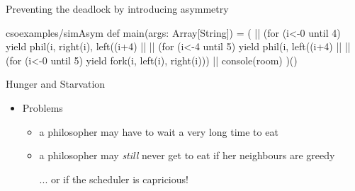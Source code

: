 \documentclass{concdistfoils}
\def\heading#1{\begin{cframed}[8.8in]{#1}\end{cframed}}
\begin{document}
\begin{slide}
\begin{exercises}
\begin{ex**}{Preventing the deadlock by introducing asymmetry}
\begin{ans}
\begin{obj}{csoexamples/simAsym}
{  def main(args: Array[String]) =
  { (  || (for (i<-0 until 4) yield phil(i, right(i),  left((i+4)%
    || || (for (i<-4 until 5) yield phil(i, left((i+4)%
    || || (for (i<-0 until 5) yield fork(i, left(i),   right(i)))
    || console(room)
    )()
  }
}
\end{obj}
\end{ans}
\end{ex**}
\begin{comment}
\begin{ex**}{An open-ended practical problem}
The philosophers work in a university whose Vice-Chancellor (President)
is keen to see that they all do their fair share of thinking, and who
is just enlightened enough to realize that he cannot allow them to get
too hungry.  He appoints a highly paid Pro Vice-Chancellor for Internal
Affairs whose job it is to measure the amount of thinking and eating
they do, and to make periodic reports to the Vice-Chancellor.

This paragon of administrative excellence needs to send messages to each
philosopher from time to time asking how much thinking they have done,
and how much eating they have done. He is also supposed to notice if
the system as a whole has deadlocked, and warn his master. In order
to do this he appoints a secretary who the philosophers must contact from time
to time. If the secretary doesn't hear from anybody for a while, then
the Pro Vice-Chancellor must be informed.

By making suitable changes to the philosophers and adding whatever other
processes you feel necessary build a model of this new system.
\end{ex**}
\end{comment}
\end{exercises}
\end{slide}

\begin{slide}
\heading{Hunger and Starvation}
\vfill
\begin{itemize}
\item Problems
\begin{itemize}
\item a philosopher may have to wait a very long time to eat
\item a philosopher may \textit{still} never get to eat if her neighbours are greedy
\begin{note}
... or if the scheduler is capricious!
\end{note}
\end{itemize}
\end{itemize}
\end{slide}
\end{document}
